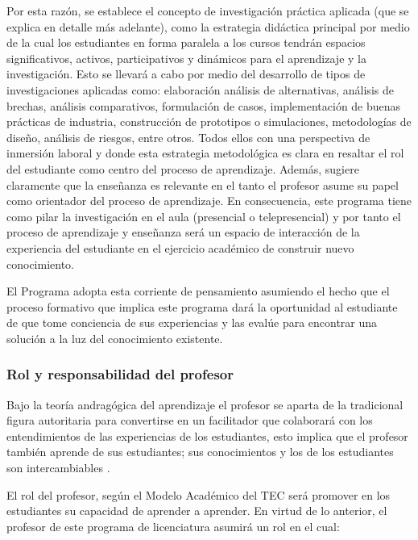Por esta razón, se establece el concepto de investigación práctica aplicada (que se explica en detalle más adelante), como la estrategia didáctica principal por medio de la cual los estudiantes en forma paralela a los cursos tendrán espacios significativos, activos, participativos y dinámicos para el aprendizaje y la investigación. Esto se llevará a cabo por medio del desarrollo de tipos de investigaciones aplicadas como: elaboración análisis de alternativas, análisis de brechas, análisis comparativos, formulación de casos, implementación de buenas prácticas de industria, construcción de prototipos o simulaciones, metodologías de diseño, análisis de riesgos, entre otros. Todos ellos con una perspectiva de inmersión laboral y donde esta estrategia metodológica es clara en resaltar el rol del estudiante como centro del proceso de aprendizaje.  Además, sugiere claramente que la enseñanza es relevante en el tanto el profesor asume su papel como orientador del proceso de aprendizaje. En consecuencia, este programa tiene como pilar la investigación en el aula (presencial o telepresencial) y por tanto el proceso de aprendizaje y enseñanza será un espacio de interacción de la experiencia del estudiante en el ejercicio académico de construir nuevo conocimiento.\par

El Programa adopta esta corriente de pensamiento asumiendo el hecho que el proceso formativo que implica este programa dará la oportunidad al estudiante de que tome conciencia de sus experiencias y las evalúe para encontrar una solución a la luz del conocimiento existente.\par

\subsubsection*{Rol y responsabilidad del profesor}

Bajo la teoría andragógica del aprendizaje el profesor se aparta de la tradicional figura autoritaria para convertirse en un facilitador que colaborará con los entendimientos de las experiencias de los estudiantes, esto implica que el profesor también aprende de sus estudiantes; sus conocimientos y los de los estudiantes son intercambiables .\par

El rol del profesor, según el Modelo Académico del TEC será promover en los estudiantes su capacidad de aprender a aprender. En virtud de lo anterior, el profesor de este programa de licenciatura asumirá un rol en el cual:\par

